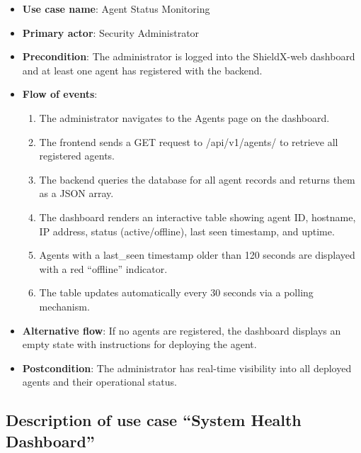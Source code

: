 \documentclass[../Main.tex]{subfiles}
\begin{document}
\begin{itemize}
    \item \textbf{Use case name}: Agent Status Monitoring
    \item \textbf{Primary actor}: Security Administrator
    \item \textbf{Precondition}: The administrator is logged into the ShieldX-web dashboard and at least one agent has registered with the backend.
    \item \textbf{Flow of events}:
        \begin{enumerate}
            \item The administrator navigates to the Agents page on the dashboard.
            \item The frontend sends a GET request to /api/v1/agents/ to retrieve all registered agents.
            \item The backend queries the database for all agent records and returns them as a JSON array.
            \item The dashboard renders an interactive table showing agent ID, hostname, IP address, status (active/offline), last seen timestamp, and uptime.
            \item Agents with a last\_seen timestamp older than 120 seconds are displayed with a red ``offline'' indicator.
            \item The table updates automatically every 30 seconds via a polling mechanism.
        \end{enumerate}
    \item \textbf{Alternative flow}: If no agents are registered, the dashboard displays an empty state with instructions for deploying the agent.
    \item \textbf{Postcondition}: The administrator has real-time visibility into all deployed agents and their operational status.
\end{itemize}

\subsection{Description of use case ``System Health Dashboard''}
\end{document}
